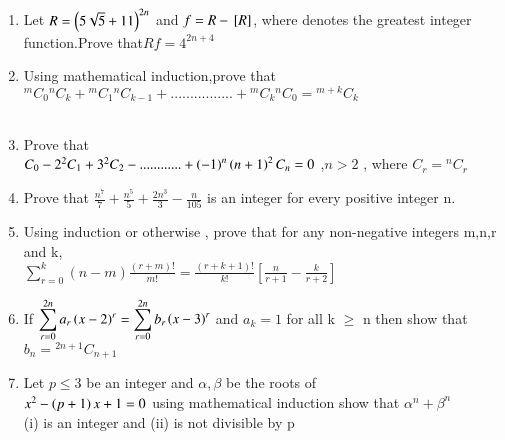 \documentclass[journal,12pt,twocolumn]{IEEEtran}
\theoremstyle{remark}
\begin{document}
\begin{enumerate}
	    \item Let $R =\left(5\sqrt{5}+11\right)^{2n}$ and $f = R -{}\left[R\right]$, where \sbrak denotes the greatest integer function.Prove  that$ Rf =4^{2n+4}$  \hfill {}\\

	    \item Using mathematical induction,prove that
		    ${}^mC_0{}^nC_k +{}^mC_1{}^nC_{k-1}+................+{}^mC_k{}^nC_0 ={}^{m+k}C_k$\\\hfill {}\\
	    \item Prove that \hfill{}\\$C_0-2^2C_1+3^2C_2-............+\left(-1\right)^n\left(n+1\right)^2C_n =0$ ,$n>2$ , where $C_r={}^nC_r$\\

	    \item Prove that   $ \frac{n^7}{7}+\frac{n^5}{5}+\frac{2n^3}{3}-\frac{n}{105}$ is an integer for every positive integer n. \hfill{}\\


	    \item Using induction or otherwise , prove that for any non-negative integers m,n,r and k,\\$\displaystyle\sum_{r=0}^{k}(n-m)\frac{(r+m)!}{m!}= \frac{(r+k+1)!}{k!}[\frac{n}{r+1}-\frac{k}{r+2}]$ \hfill{}

	    \item If $\displaystyle\sum_{r=0}^{2n}a_r\left(x-2\right)^r=\displaystyle\sum_{r=0}^{2n}b_r$$\left(x-3\right)^r$ and $a_k =1$ for all k $\geq$ n then show that $b_n = {}^{2n+1}C_{n+1}$ \hfill {}

	    \item Let  $p\leq 3$ be an integer and $\alpha,\beta$ be  the roots of\\  $x^2-\left(p+1\right)x+1=0 $ using mathematical induction show that $\alpha^n +\beta^n$\\ (i) is an integer and   
		    (ii) is not divisible by p  \hfill{}
		    
 \end{enumerate}
 
\end{document}
